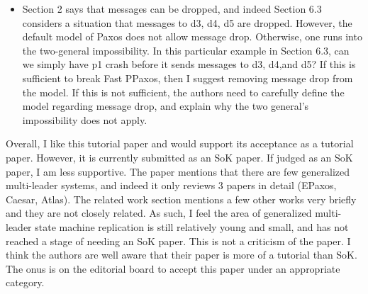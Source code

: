 \documentclass[letterpaper,twocolumn,10pt]{article}
\newenvironment{reviewerquote}
{\list{}{\leftmargin=\parindent\rightmargin=0in}\item[] \itshape \color{ReviewerDarkGray}}%
{\endlist}
\begin{document}
\begin{reviewerquote}
  \begin{itemize}
    \item
      Section 2 says that messages can be dropped, and indeed Section 6.3
      considers a situation that messages to d3, d4, d5 are dropped. However,
      the default model of Paxos does not allow message drop. Otherwise, one
      runs into the two-general impossibility. In this particular example in
      Section 6.3, can we simply have p1 crash before it sends messages to d3,
      d4,and d5? If this is sufficient to break Fast PPaxos, then I suggest
      removing message drop from the model. If this is not sufficient, the
      authors need to carefully define the model regarding message drop, and
      explain why the two general's impossibility does not apply.
  \end{itemize}

  Overall, I like this tutorial paper and would support its acceptance as a
  tutorial paper. However, it is currently submitted as an SoK paper. If judged
  as an SoK paper, I am less supportive. The paper mentions that there are few
  generalized multi-leader systems, and indeed it only reviews 3 papers in
  detail (EPaxos, Caesar, Atlas). The related work section mentions a few other
  works very briefly and they are not closely related. As such, I feel the area
  of generalized multi-leader state machine replication is still relatively
  young and small, and has not reached a stage of needing an SoK paper. This is
  not a criticism of the paper. I think the authors are well aware that their
  paper is more of a tutorial than SoK. The onus is on the editorial board to
  accept this paper under an appropriate category.
\end{reviewerquote}




\end{document}
